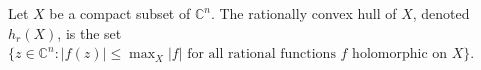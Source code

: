 
Let $X$ be a compact subset of $\mathbb{C}^n$. The rationally convex hull of $X$, denoted $h_r(X)$, is the set $\{z \in \mathbb{C}^n : |f(z)| \leq \max_X |f| \text{ for all rational functions } f \text{ holomorphic on } X\}$.
